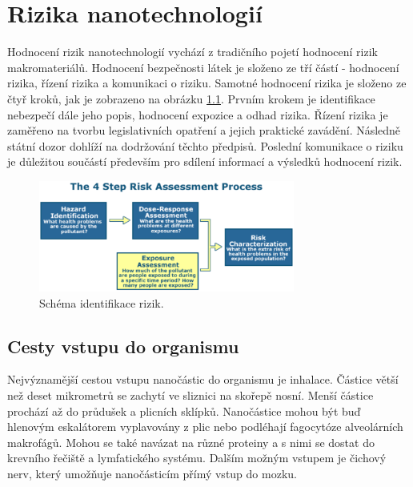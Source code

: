 \chapter{Rizika nanotechnologií}

Hodnocení rizik nanotechnologií vychází z tradičního pojetí hodnocení rizik makromateriálů. Hodnocení bezpečnosti látek je složeno ze tří částí - hodnocení rizika, řízení rizika a komunikaci o riziku. Samotné hodnocení rizika je složeno ze čtyř kroků, jak je zobrazeno na obrázku \ref{fig:hodnoceni_rizik}. Prvním krokem je identifikace nebezpečí dále jeho popis, hodnocení expozice a odhad rizika. Řízení rizika je zaměřeno na tvorbu legislativních opatření a jejich praktické zavádění. Následně státní dozor dohlíží na dodržování těchto předpisů. Poslední komunikace o riziku je důležitou součástí především pro sdílení informací a výsledků hodnocení rizik. \cite{filipova2012} \\



\begin{figure}
    \centering
    \includegraphics[width=0.75\textwidth]{pictures/hodnoceni_rizika.png}
    \caption{Schéma identifikace rizik. \cite{filipova2012}}
    \label{fig:hodnoceni_rizik}
\end{figure}
    
\section{Cesty vstupu do organismu}

Nejvýznamější cestou vstupu nanočástic do organismu je inhalace. Částice větší než deset mikrometrů se zachytí ve sliznici na skořepě nosní. Menší částice prochází až do průdušek a plicních sklípků. Nanočástice mohou být buď hlenovým eskalátorem vyplavovány z plic nebo podléhají fagocytóze alveolárních makrofágů. \cite{nohavica2011}  Mohou se také navázat na různé proteiny a s nimi se dostat do krevního řečiště a lymfatického systému. Dalším možným vstupem je čichový nerv, který umožňuje nanočásticím přímý vstup do mozku. \cite{filipova2012}\\

